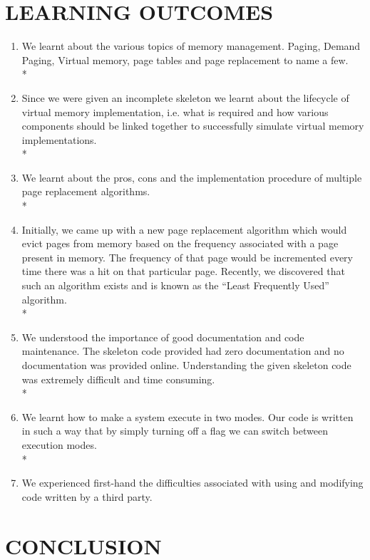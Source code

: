 \documentclass[12pt, oneside, a4paper]{report}
\begin{document}
\section*{LEARNING OUTCOMES}
\begin{enumerate}
\item We learnt about the various topics of memory management. Paging, Demand Paging, Virtual memory, page tables and page replacement to name a few.
\\*
\item Since we were given an incomplete skeleton we learnt about the lifecycle of virtual memory implementation, i.e. what is required and how various components should be linked together to successfully simulate virtual memory implementations. 
\\*
\item We learnt about the pros, cons and the implementation procedure of multiple page replacement algorithms.
\\*
\item Initially, we came up with a new page replacement algorithm which would evict pages from memory based on the frequency associated with a page present in memory. The frequency of that page would be incremented every time there was a hit on that particular page. Recently, we discovered that such an algorithm exists and is known as the “Least Frequently Used” algorithm.
\\*
\item We understood the importance of good documentation and code maintenance. The skeleton code provided had zero documentation and no documentation was provided online. Understanding the given skeleton code was extremely difficult and time consuming.
\\*
\item We learnt how to make a system execute in two modes. Our code is written in such a way that by simply turning off a flag we can switch between execution modes.
\\*
\item We experienced first-hand the difficulties associated with using and modifying code written by a third party.
\end{enumerate}
\newpage

\section*{CONCLUSION}
\end{document}
